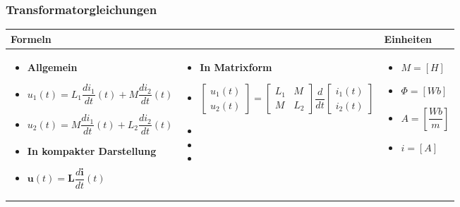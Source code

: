    	\subsubsection{Transformatorgleichungen}										
\begin{tabular}{ | m{7.5cm} m{7.5cm} | m{3cm}  | }
	\hline
	Formeln & & Einheiten \\ \hline
	\hline
	\begin{itemize}
		\item \textbf{Allgemein}
		\item[] $u_1(t)=L_1\dfrac{di_1}{dt}(t)+M\dfrac{di_2}{dt}(t)$
		\item[] $u_2(t)=M\dfrac{di_1}{dt}(t)+L_2\dfrac{di_2}{dt}(t)$
		
		\item \textbf{In kompakter Darstellung}
		\item[] $\mathbf{u}(t)=\mathbf{L}\dfrac{d\mathbf{i}}{dt}(t)$
	\end{itemize} 
	&   	
\begin{itemize}
	\item \textbf{In Matrixform}
	\item[] $\begin{bmatrix}
	u_1(t)\\u_2(t)
	\end{bmatrix}=\begin{bmatrix}
	L_1&M \\M&L_2
	\end{bmatrix}\dfrac{d}{dt}\begin{bmatrix}
	i_1(t)\\i_2(t)
	\end{bmatrix}$
	\item[]
	\item[]
	\item[]

\end{itemize}
&
	\begin{itemize}
	\item[] $M = [H]$
	\item[] $\Phi= [Wb]$
	\item[] $A=[\dfrac{Wb}{m}]$
	\item[] $i=[A]$
\end{itemize} 
	\\ \hline
\end{tabular}

\newpage

